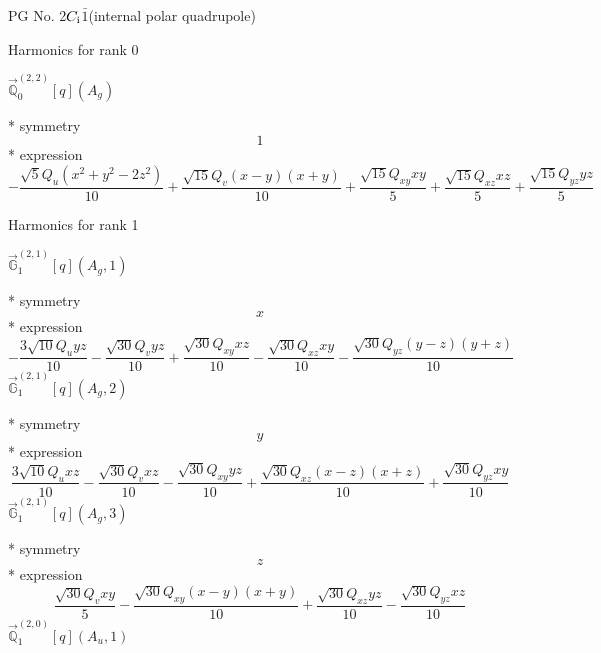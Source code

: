 \documentclass[fleqn,8pt]{jsarticle}
\begin{document}
\setcounter{MaxMatrixCols}{32}

\renewcommand{\tablename}{Table~}
\renewcommand{\figurename}{Figure~}
\begin{center}
\LARGE
PG No. 2\quad$C_{\rm i}$\quad$\bar{1}$\quad[ triclinic ] (internal polar quadrupole)
\end{center}

\noindent * Harmonics for rank 0

\noindent\quad $\vec{\mathbb{Q}}_{0}^{(2,2)}[q](A_{g})$

\noindent\quad ** symmetry
\begin{dmath*}
1
\end{dmath*}
\noindent\quad ** expression
\begin{dmath*}
- \frac{\sqrt{5} Q_{u} \left(x^{2} + y^{2} - 2 z^{2}\right)}{10} + \frac{\sqrt{15} Q_{v} \left(x - y\right) \left(x + y\right)}{10} + \frac{\sqrt{15} Q_{xy} x y}{5} + \frac{\sqrt{15} Q_{xz} x z}{5} + \frac{\sqrt{15} Q_{yz} y z}{5}
\end{dmath*}

\noindent * Harmonics for rank 1

\noindent\quad $\vec{\mathbb{G}}_{1}^{(2,1)}[q](A_{g},1)$

\noindent\quad ** symmetry
\begin{dmath*}
x
\end{dmath*}
\noindent\quad ** expression
\begin{dmath*}
- \frac{3 \sqrt{10} Q_{u} y z}{10} - \frac{\sqrt{30} Q_{v} y z}{10} + \frac{\sqrt{30} Q_{xy} x z}{10} - \frac{\sqrt{30} Q_{xz} x y}{10} - \frac{\sqrt{30} Q_{yz} \left(y - z\right) \left(y + z\right)}{10}
\end{dmath*}
\noindent\quad $\vec{\mathbb{G}}_{1}^{(2,1)}[q](A_{g},2)$

\noindent\quad ** symmetry
\begin{dmath*}
y
\end{dmath*}
\noindent\quad ** expression
\begin{dmath*}
\frac{3 \sqrt{10} Q_{u} x z}{10} - \frac{\sqrt{30} Q_{v} x z}{10} - \frac{\sqrt{30} Q_{xy} y z}{10} + \frac{\sqrt{30} Q_{xz} \left(x - z\right) \left(x + z\right)}{10} + \frac{\sqrt{30} Q_{yz} x y}{10}
\end{dmath*}
\noindent\quad $\vec{\mathbb{G}}_{1}^{(2,1)}[q](A_{g},3)$

\noindent\quad ** symmetry
\begin{dmath*}
z
\end{dmath*}
\noindent\quad ** expression
\begin{dmath*}
\frac{\sqrt{30} Q_{v} x y}{5} - \frac{\sqrt{30} Q_{xy} \left(x - y\right) \left(x + y\right)}{10} + \frac{\sqrt{30} Q_{xz} y z}{10} - \frac{\sqrt{30} Q_{yz} x z}{10}
\end{dmath*}
\noindent\quad $\vec{\mathbb{Q}}_{1}^{(2,0)}[q](A_{u},1)$
\end{document}
